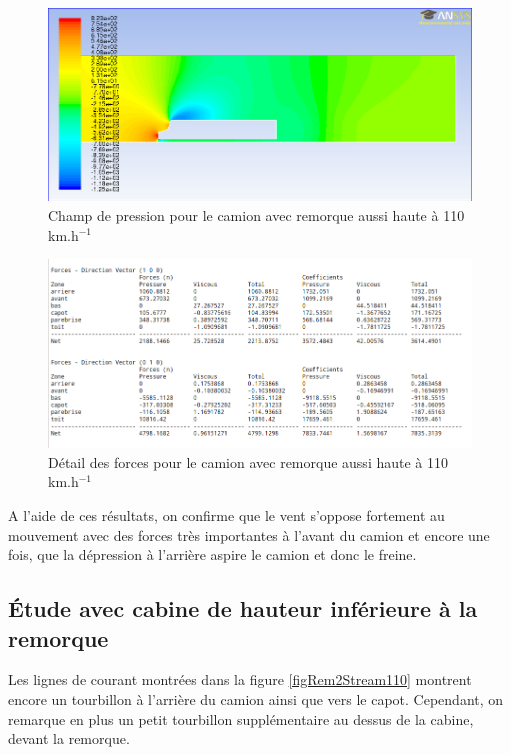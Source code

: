 \begin{figure}[!h]
\centering
\includegraphics[scale=0.4]{resultsCx/remorque1_110_pression.png}
\caption{Champ de pression pour le camion avec remorque aussi haute à 110 km.h$^{-1}$}
\label{figRem1Pres110}
\end{figure}

\begin{figure}[!h]
\centering
\includegraphics[scale=0.4]{resultsCx/forces_rem1.png}
\caption{Détail des forces pour le camion avec remorque aussi haute à 110 km.h$^{-1}$}
\label{resultanteForces1}
\end{figure}
A l'aide de ces résultats, on confirme que le vent s'oppose fortement au mouvement avec des forces très importantes à l'avant du camion et encore une fois, que la dépression à l'arrière aspire le camion et donc le freine.

\clearpage

\subsection{Étude avec cabine de hauteur inférieure à la remorque}
Les lignes de courant montrées dans la figure \ref{figRem2Stream110} montrent encore un tourbillon à l'arrière du camion ainsi que vers le capot. Cependant, on remarque en plus un petit tourbillon supplémentaire au dessus de la cabine, devant la remorque. \\ 

